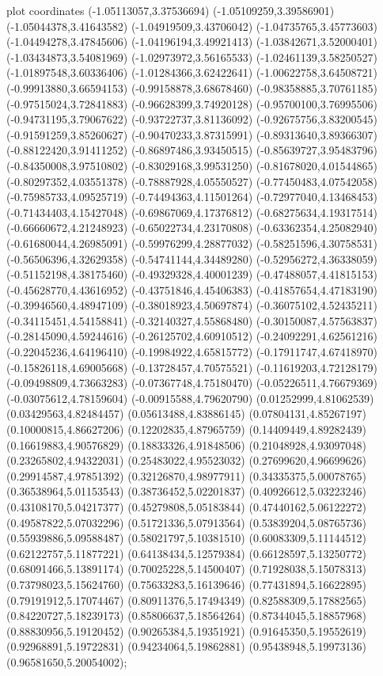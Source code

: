  plot coordinates {(-1.05113057,3.37536694) (-1.05109259,3.39586901) (-1.05044378,3.41643582) (-1.04919509,3.43706042) (-1.04735765,3.45773603) (-1.04494278,3.47845606) (-1.04196194,3.49921413) (-1.03842671,3.52000401) (-1.03434873,3.54081969) (-1.02973972,3.56165533) (-1.02461139,3.58250527) (-1.01897548,3.60336406) (-1.01284366,3.62422641) (-1.00622758,3.64508721) (-0.99913880,3.66594153) (-0.99158878,3.68678460) (-0.98358885,3.70761185) (-0.97515024,3.72841883) (-0.96628399,3.74920128) (-0.95700100,3.76995506) (-0.94731195,3.79067622) (-0.93722737,3.81136092) (-0.92675756,3.83200545) (-0.91591259,3.85260627) (-0.90470233,3.87315991) (-0.89313640,3.89366307) (-0.88122420,3.91411252) (-0.86897486,3.93450515) (-0.85639727,3.95483796) (-0.84350008,3.97510802) (-0.83029168,3.99531250) (-0.81678020,4.01544865) (-0.80297352,4.03551378) (-0.78887928,4.05550527) (-0.77450483,4.07542058) (-0.75985733,4.09525719) (-0.74494363,4.11501264) (-0.72977040,4.13468453) (-0.71434403,4.15427048) (-0.69867069,4.17376812) (-0.68275634,4.19317514) (-0.66660672,4.21248923) (-0.65022734,4.23170808) (-0.63362354,4.25082940) (-0.61680044,4.26985091) (-0.59976299,4.28877032) (-0.58251596,4.30758531) (-0.56506396,4.32629358) (-0.54741144,4.34489280) (-0.52956272,4.36338059) (-0.51152198,4.38175460) (-0.49329328,4.40001239) (-0.47488057,4.41815153) (-0.45628770,4.43616952) (-0.43751846,4.45406383) (-0.41857654,4.47183190) (-0.39946560,4.48947109) (-0.38018923,4.50697874) (-0.36075102,4.52435211) (-0.34115451,4.54158841) (-0.32140327,4.55868480) (-0.30150087,4.57563837) (-0.28145090,4.59244616) (-0.26125702,4.60910512) (-0.24092291,4.62561216) (-0.22045236,4.64196410) (-0.19984922,4.65815772) (-0.17911747,4.67418970) (-0.15826118,4.69005668) (-0.13728457,4.70575521) (-0.11619203,4.72128179) (-0.09498809,4.73663283) (-0.07367748,4.75180470) (-0.05226511,4.76679369) (-0.03075612,4.78159604) (-0.00915588,4.79620790) (0.01252999,4.81062539) (0.03429563,4.82484457) (0.05613488,4.83886145) (0.07804131,4.85267197) (0.10000815,4.86627206) (0.12202835,4.87965759) (0.14409449,4.89282439) (0.16619883,4.90576829) (0.18833326,4.91848506) (0.21048928,4.93097048) (0.23265802,4.94322031) (0.25483022,4.95523032) (0.27699620,4.96699626) (0.29914587,4.97851392) (0.32126870,4.98977911) (0.34335375,5.00078765) (0.36538964,5.01153543) (0.38736452,5.02201837) (0.40926612,5.03223246) (0.43108170,5.04217377) (0.45279808,5.05183844) (0.47440162,5.06122272) (0.49587822,5.07032296) (0.51721336,5.07913564) (0.53839204,5.08765736) (0.55939886,5.09588487) (0.58021797,5.10381510) (0.60083309,5.11144512) (0.62122757,5.11877221) (0.64138434,5.12579384) (0.66128597,5.13250772) (0.68091466,5.13891174) (0.70025228,5.14500407) (0.71928038,5.15078313) (0.73798023,5.15624760) (0.75633283,5.16139646) (0.77431894,5.16622895) (0.79191912,5.17074467) (0.80911376,5.17494349) (0.82588309,5.17882565) (0.84220727,5.18239173) (0.85806637,5.18564264) (0.87344045,5.18857968) (0.88830956,5.19120452) (0.90265384,5.19351921) (0.91645350,5.19552619) (0.92968891,5.19722831) (0.94234064,5.19862881) (0.95438948,5.19973136) (0.96581650,5.20054002)};
